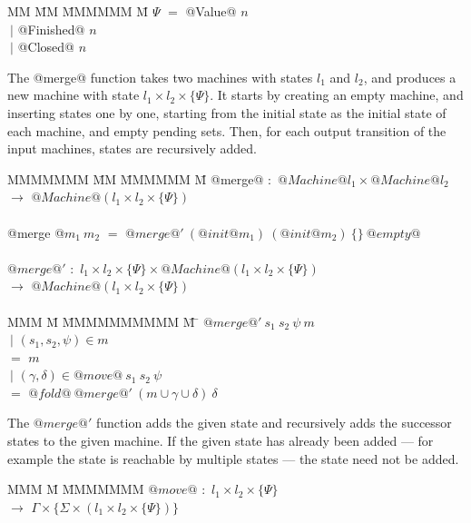 \begin{tabbing}
MM \= MM \= MMMMMM \= M\kill
$\Psi$ \> $=$  \> @Value@     \> $n$         \\
       \> $~|$ \> @Finished@  \> $n$         \\
       \> $~|$ \> @Closed@    \> $n$         \\
\end{tabbing}

The @merge@ function takes two machines with states $l_1$ and $l_2$, and produces a new machine with state $l_1 \times l_2 \times \{\Psi\}$.
It starts by creating an empty machine, and inserting states one by one, starting from the initial state as the initial state of each machine, and empty pending sets.
Then, for each output transition of the input machines, states are recursively added.

\begin{tabbing}
MMMMMMM \= MM \= MMMMMM \= M\kill
@merge@ \> $:$ \> $@Machine @l_1 \times @Machine @l_2$ \\
        \> $\to$ \> $@Machine @(l_1 \times l_2 \times \{\Psi\})$ \\
\\
@merge @$m_1~m_2$ \> $=$ \> $@merge@'~(@init @m_1)~(@init @m_2)~\{\}~@empty@$ \\
\\
$@merge@'$ \> $:$ \> $l_1 \times l_2 \times \{\Psi\} \times @Machine @(l_1 \times l_2 \times \{\Psi\})$ \\
           \> $\to$ \> $@Machine @(l_1 \times l_2 \times \{\Psi\})$ \\
\\
MMM \= M \= MMMMMMMMMM \= M \=\kill
$@merge@'~s_1~s_2~\psi~m$ \\
 \> $~|$ \> $(s_1, s_2, \psi) \in m$  \\
 \> $=$  \> $m$ \\
 \> $~|$ \> $(\gamma,\delta) \in @move@~s_1~s_2~\psi$ \\
 \> $=$  \> $@fold@~@merge@'~(m \cup \gamma \cup \delta)~\delta$ \\
\end{tabbing}

The $@merge@'$ function adds the given state and recursively adds the successor states to the given machine.
If the given state has already been added --- for example the state is reachable by multiple states --- the state need not be added.

\begin{tabbing}
MMM \= M \= MMMMMMM\kill
$@move@$ \> $:$ \> $l_1 \times l_2 \times \{\Psi\}$ \\
           \> $\to$ \> $\Gamma \times \{\Sigma \times (l_1 \times l_2 \times \{\Psi\})\}$ \\
\end{tabbing}

